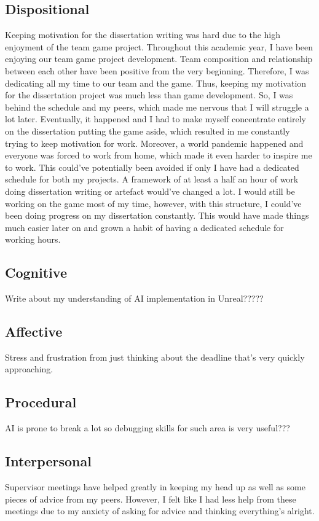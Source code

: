 \documentclass[journal]{IEEEtran}
\begin{document}
\subsection{Dispositional} %
Keeping motivation for the dissertation writing was hard due to the high enjoyment of the team game project. Throughout this academic year, I have been enjoying our team game project development. Team composition and relationship between each other have been positive from the very beginning. Therefore, I was dedicating all my time to our team and the game. Thus, keeping my motivation for the dissertation project was much less than game development. So, I was behind the schedule and my peers, which made me nervous that I will struggle a lot later. Eventually, it happened and I had to make myself concentrate entirely on the dissertation putting the game aside, which resulted in me constantly trying to keep motivation for work. Moreover, a world pandemic happened and everyone was forced to work from home, which made it even harder to inspire me to work. This could've potentially been avoided if only I have had a dedicated schedule for both my projects. A framework of at least a half an hour of work doing dissertation writing or artefact would've changed a lot. I would still be working on the game most of my time, however, with this structure, I could've been doing progress on my dissertation constantly. This would have made things much easier later on and grown a habit of having a dedicated schedule for working hours.

\subsection{Cognitive}
Write about my understanding of AI implementation in Unreal?????

\subsection{Affective}
Stress and frustration from just thinking about the deadline that's very quickly approaching.

\subsection{Procedural}
AI is prone to break a lot so debugging skills for such area is very useful???

\subsection{Interpersonal}
Supervisor meetings have helped greatly in keeping my head up as well as some pieces of advice from my peers. However, I felt like I had less help from these meetings due to my anxiety of asking for advice and thinking everything's alright.
\end{document}
